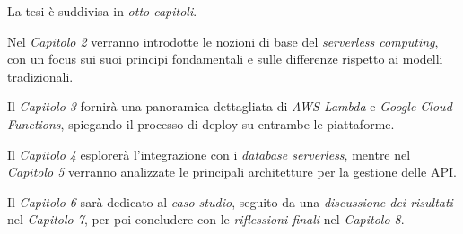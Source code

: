 La tesi è suddivisa in \textit{otto capitoli}. 

Nel \textit{Capitolo 2} verranno introdotte le nozioni di base del \textit{serverless computing}, con un focus sui suoi principi fondamentali e sulle differenze rispetto ai modelli tradizionali. 

Il \textit{Capitolo 3} fornirà una panoramica dettagliata di \textit{AWS Lambda} e \textit{Google Cloud Functions}, spiegando il processo di deploy su entrambe le piattaforme. 

Il \textit{Capitolo 4} esplorerà l'integrazione con i \textit{database serverless}, mentre nel \textit{Capitolo 5} verranno analizzate le principali architetture per la gestione delle API. 

Il \textit{Capitolo 6} sarà dedicato al \textit{caso studio}, seguito da una \textit{discussione dei risultati} nel \textit{Capitolo 7}, per poi concludere con le \textit{riflessioni finali} nel \textit{Capitolo 8}.